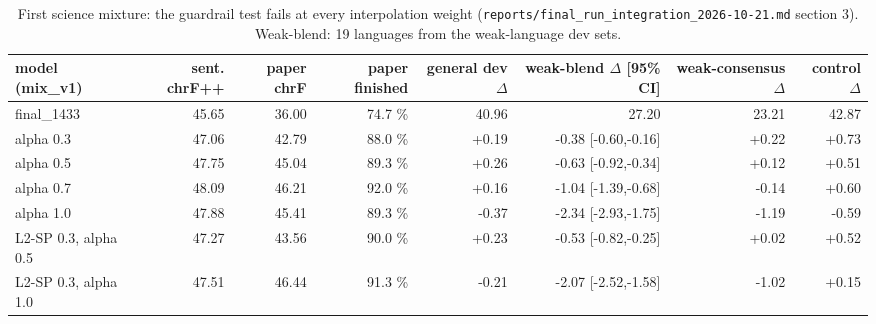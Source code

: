 \begin{table}[t]
\centering
\footnotesize
\setlength{\tabcolsep}{3pt}
\caption{First science mixture: the guardrail test fails at every interpolation weight (\texttt{reports/final\_run\_integration\_2026-10-21.md} section 3). Weak-blend: 19 languages from the weak-language dev sets.}
\label{tab:t_sft_stage_v1}
\begin{adjustbox}{max width=\linewidth}
{\def\LTcaptype{none} %
\begin{tabular}{@{}lrrrrrrr@{}}
\toprule
model (mix\_v1) & sent. chrF++ & paper chrF & paper finished & general dev \(\Delta\) & weak-blend \(\Delta\) {[}95\% CI{]} & weak-consensus \(\Delta\) & control \(\Delta\) \\
\midrule
final\_1433 & 45.65 & 36.00 & 74.7 \% & 40.96 & 27.20 & 23.21 & 42.87 \\
alpha 0.3 & 47.06 & 42.79 & 88.0 \% & +0.19 & -0.38 {[}-0.60,-0.16{]} & +0.22 & +0.73 \\
alpha 0.5 & 47.75 & 45.04 & 89.3 \% & +0.26 & -0.63 {[}-0.92,-0.34{]} & +0.12 & +0.51 \\
alpha 0.7 & 48.09 & 46.21 & 92.0 \% & +0.16 & -1.04 {[}-1.39,-0.68{]} & -0.14 & +0.60 \\
alpha 1.0 & 47.88 & 45.41 & 89.3 \% & -0.37 & -2.34 {[}-2.93,-1.75{]} & -1.19 & -0.59 \\
L2-SP 0.3, alpha 0.5 & 47.27 & 43.56 & 90.0 \% & +0.23 & -0.53 {[}-0.82,-0.25{]} & +0.02 & +0.52 \\
L2-SP 0.3, alpha 1.0 & 47.51 & 46.44 & 91.3 \% & -0.21 & -2.07 {[}-2.52,-1.58{]} & -1.02 & +0.15 \\
\bottomrule
\end{tabular}
}
\end{adjustbox}
\end{table}

